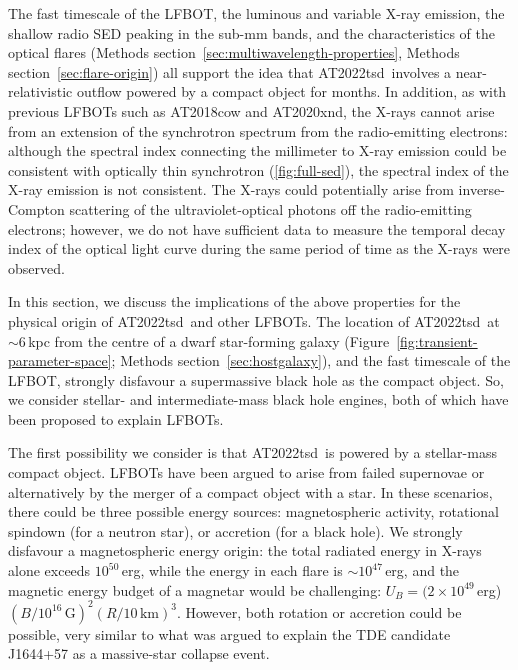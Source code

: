 \documentclass{nature_plusfigure}
\newcommand{\at}{AT2022tsd}
\begin{document}
\begin{methods}
The fast timescale of the LFBOT, the luminous and variable X-ray emission, the shallow radio SED peaking in the sub-mm bands, and the characteristics of the optical flares (Methods section~\ref{sec:multiwavelength-properties}, Methods section~\ref{sec:flare-origin}) all support the idea that \at\ involves a near-relativistic outflow powered by a compact object for months.
In addition, as with previous LFBOTs such as AT2018cow and AT2020xnd, the X-rays cannot arise from an extension of the synchrotron spectrum from the radio-emitting electrons\cite{Margutti2019,Ho2019,Ho2022_AT2020xnd}: although the spectral index connecting the millimeter to X-ray emission could be consistent with optically thin synchrotron (\ref{fig:full-sed}), the spectral index of the X-ray emission is not consistent.
The X-rays could potentially arise from inverse-Compton scattering of the ultraviolet-optical photons off the radio-emitting electrons; however, we do not have sufficient data to measure the temporal decay index of the optical light curve during the same period of time as the X-rays were observed.

In this section, we discuss the implications of the above properties for the physical origin of \at\ and other LFBOTs. The location of \at\ at $\sim6\,$kpc from the centre of a dwarf star-forming galaxy (Figure~\ref{fig:transient-parameter-space}; Methods section~\ref{sec:hostgalaxy}), and the fast timescale of the LFBOT, strongly disfavour a supermassive black hole as the compact object. So, we consider stellar- and intermediate-mass black hole engines, both of which have been proposed to explain LFBOTs\cite{Perley2019,Margutti2019,Metzger2022,Chen2023b}. 

The first possibility we consider is that \at\ is powered by a stellar-mass compact object. LFBOTs have been argued to arise from failed supernovae\cite{Perley2019,Margutti2019} or alternatively by the merger of a compact object with a star\cite{Metzger2022}. In these scenarios, there could be three possible energy sources: magnetospheric activity, rotational spindown (for a neutron star), or accretion (for a black hole). We strongly disfavour a magnetospheric energy origin: the total radiated energy in X-rays alone exceeds $10^{50}\,$erg, while the energy in each flare is $\sim10^{47}\,$erg, and the magnetic energy budget of a magnetar would be challenging: $U_B = (2\times10^{49}\,$erg)$(B/10^{16}\,\mathrm{G})^2 (R/10\,\mathrm{km})^3$. However, both rotation or accretion could be possible, very similar to what was argued to explain the TDE candidate J1644+57 as a massive-star collapse event\cite{Quataert2012}. 


\end{methods}
\end{document}
